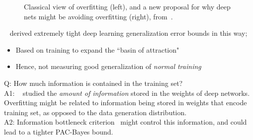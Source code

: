 \begin{figure}
    \centering
     \hspace{2mm}
    \caption{Classical view of overfitting (left), and a new proposal for why deep nets might be avoiding overfitting (right), from~\citet{belkin2018overfitting}.}
    \label{fig:overfitting}
\end{figure}

~\citet{dziugaite2017entropy} derived extremely tight deep learning generalization error bounds in this way;
\begin{itemize}
    \item Based on training to expand the ``basin of attraction"
    \item Hence, not measuring good generalization of {\it normal training}
\end{itemize}

Q: How much information is contained in the training set? \\

A1: ~\citet{achille2018information} studied the {\it amount of information} stored in the weights of deep networks. Overfitting might be related to information being stored in weights that encode training set, as opposed to the data generation distribution. \\

A2: Information bottleneck criterion~\cite{} might control this information, and could lead to a tighter PAC-Bayes bound. \\

